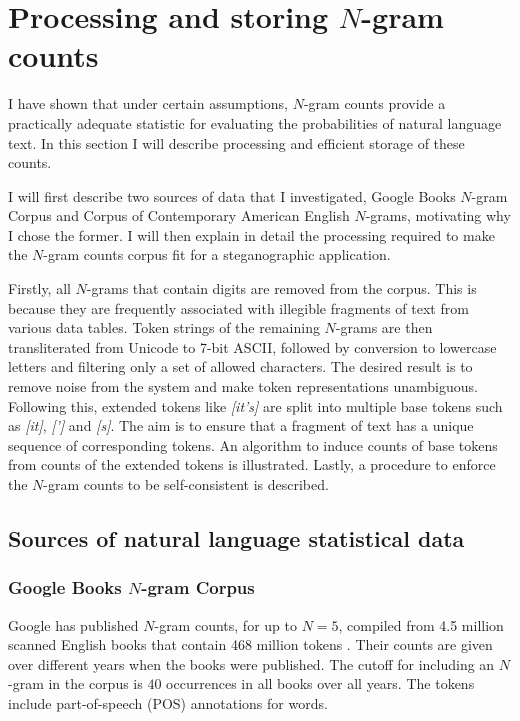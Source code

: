 \documentclass[draft]{IIBproject}
\DeclareRobustCommand{\ngram}[1]{\emph{[#1]}}
\begin{document}
\cleardoublepage
\section{Processing and storing $N$-gram counts}
\label{sec:processing_ngrams}

I have shown that under certain assumptions, $N$-gram counts provide a practically adequate statistic for evaluating the probabilities of natural language text. In this section I will describe processing and efficient storage of these counts.

I will first describe two sources of data that I investigated, Google Books $N$-gram Corpus and Corpus of Contemporary American English $N$-grams, motivating why I chose the former. I will then explain in detail the processing required to make the $N$-gram counts corpus fit for a steganographic application.

Firstly, all $N$-grams that contain digits are removed from the corpus. This is because they are frequently associated with illegible fragments of text from various data tables. Token strings of the remaining $N$-grams are then transliterated from Unicode to 7-bit ASCII, followed by conversion to lowercase letters and filtering only a set of allowed characters. The desired result is to remove noise from the system and make token representations unambiguous. Following this, extended tokens like \ngram{it's} are split into multiple base tokens such as \ngram{it}, \ngram{'} and \ngram{s}. The aim is to ensure that a fragment of text has a unique sequence of corresponding tokens. An algorithm to induce counts of base tokens from counts of the extended tokens is illustrated. Lastly, a procedure to enforce the $N$-gram counts to be self-consistent is described.

\FloatBarrier
\subsection{Sources of natural language statistical data}

\subsubsection{Google Books $N$-gram Corpus}
\label{sec:google_books}

Google has published $N$-gram counts, for up to $N=5$, compiled from 4.5 million scanned English books that contain 468 million tokens \cite{googlengrams2011, lin2012paper}. Their counts are given over different years when the books were published. The cutoff for including an $N$-gram in the corpus is $40$ occurrences in all books over all years. The tokens include part-of-speech (POS) annotations for words.
\end{document}
